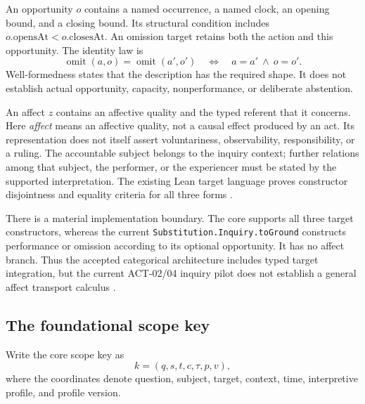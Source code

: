 \documentclass[11pt]{article}
\newcommand{\op}[1]{\operatorname{#1}}
\begin{document}
An opportunity \(o\) contains a named occurrence, a named clock, an opening bound, and a closing bound. Its structural condition includes
\(o.\mathrm{opensAt}<o.\mathrm{closesAt}\).
An omission target retains both the action and this opportunity. The identity law is
\[
 \op{omit}(a,o)=\op{omit}(a',o')
 \quad\Longleftrightarrow\quad a=a'\ \land\ o=o'.
\]
Well-formedness states that the description has the required shape. It does not establish actual opportunity, capacity, nonperformance, or deliberate abstention.

An affect \(z\) contains an affective quality and the typed referent that it concerns. Here \emph{affect} means an affective quality, not a causal effect produced by an act. Its representation does not itself assert voluntariness, observability, responsibility, or a ruling. The accountable subject belongs to the inquiry context; further relations among that subject, the performer, or the experiencer must be stated by the supported interpretation. The existing Lean target language proves constructor disjointness and equality criteria for all three forms \cite{core}.

There is a material implementation boundary. The core supports all three target constructors, whereas the current \texttt{Substitution.\allowbreak{}Inquiry.\allowbreak{}toGround} constructs performance or omission according to its optional opportunity. It has no affect branch. Thus the accepted categorical architecture includes typed target integration, but the current ACT-02/04 inquiry pilot does not establish a general affect transport calculus \cite{substitution,semantics}.

\subsection{The foundational scope key}

Write the core scope key as
\[
 k=(q,s,t,c,\tau,p,v),
\]
where the coordinates denote question, subject, target, context, time, interpretive profile, and profile version.
\end{document}
